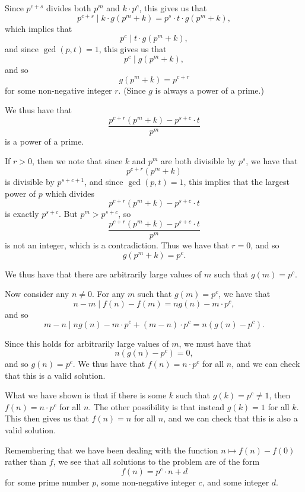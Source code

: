 \documentclass[12pt]{article}
\begin{document}
\begin{enumerate}
Since $p^{c + s}$ divides both $p^m$ and $k \cdot p^c$, this gives us that
\[
    p^{c + s} \mid k \cdot g \left( p^m + k \right) = p^s \cdot t \cdot g \left(
    p^m + k \right),
\]
which implies that
\[
    p^c \mid t \cdot g \left( p^m + k \right),
\]
and since $\gcd(p, t) = 1$, this gives us that
\[
    p^c \mid g \left( p^m + k \right),
\]
and so
\[
    g \left( p^m + k \right) = p^{c + r}
\]
for some non-negative integer $r$. (Since $g$ is always a power of a prime.)

We thus have that
\[
    \frac{p^{c + r} \left( p^m + k \right) - p^{s + c} \cdot t}{p^m}
\]
is a power of a prime.

If $r > 0$, then we note that since $k$ and $p^m$ are both divisible by $p^s$,
we have that
\[
    p^{c + r} \left( p^m + k \right)
\]
is divisible by $p^{s + c + 1}$, and since $\gcd(p, t) = 1$, this implies that
the largest power of $p$ which divides
\[
    p^{c + r} \left( p^m + k \right) - p^{s + c} \cdot t
\]
is exactly $p^{s + c}$. But $p^m > p^{s + c}$, so
\[
    \frac{p^{c + r} \left( p^m + k \right) - p^{s + c} \cdot t}{p^m}
\]
is not an integer, which is a contradiction. Thus we have that $r = 0$, and so
\[
    g \left( p^m + k \right) = p^c.
\]

We thus have that there are arbitrarily large values of $m$ such that $g(m) =
p^c$.

Now consider any $n \neq 0$. For any $m$ such that $g(m) = p^c$, we have that
\[
    n - m \mid f(n) - f(m) = ng(n) - m\cdot p^c,
\]
and so
\[
    m - n \mid ng(n) - m\cdot p^c + (m - n) \cdot p^c = n(g(n) - p^c).
\]

Since this holds for arbitrarily large values of $m$, we must have that
\[
    n(g(n) - p^c) = 0,
\]
and so $g(n) = p^c$. We thus have that $f(n) = n \cdot p^c$ for all $n$, and we
can check that this is a valid solution.

What we have shown is that if there is some $k$ such that $g(k) = p^c \neq 1$,
then $f(n) = n \cdot p^c$ for all $n$. The other possibility is that instead
$g(k) = 1$ for all $k$. This then gives us that $f(n) = n$ for all $n$, and we
can check that this is also a valid solution.

Remembering that we have been dealing with the function $n \mapsto f(n) - f(0)$
rather than $f$, we see that all solutions to the problem are of the form
\[
    f(n) = p^c \cdot n + d
\]
for some prime number $p$, some non-negative integer $c$, and some integer $d$.

\end{enumerate}
\end{document}
